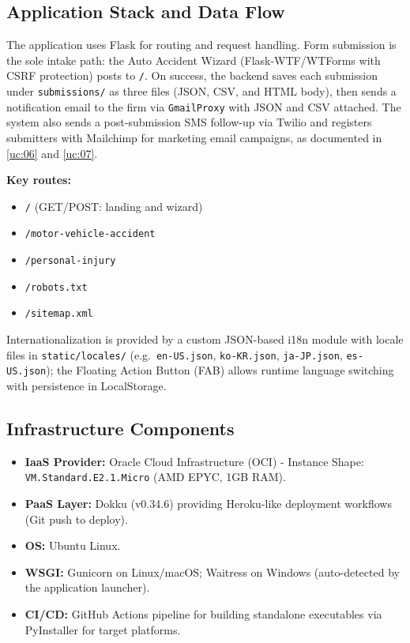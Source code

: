\documentclass{article}
\begin{document}
\subsection{Application Stack and Data Flow}
The application uses Flask for routing and request handling. Form submission is the sole intake path: the Auto Accident Wizard (Flask-WTF/WTForms with CSRF protection) posts to \texttt{/}. On success, the backend saves each submission under \texttt{submissions/} as three files (JSON, CSV, and HTML body), then sends a notification email to the firm via \texttt{GmailProxy} with JSON and CSV attached. The system also sends a post-submission SMS follow-up via Twilio and registers submitters with Mailchimp for marketing email campaigns, as documented in \ref{uc:06} and \ref{uc:07}.

\textbf{Key routes:} 
\begin{itemize}
  \item \texttt{/} (GET/POST: landing and wizard)
  \item \texttt{/motor-vehicle-accident}
  \item \texttt{/personal-injury}
  \item \texttt{/robots.txt}
  \item \texttt{/sitemap.xml}
\end{itemize}
Internationalization is provided by a custom JSON-based i18n 
module with locale files in \texttt{static/locales/} 
(e.g.\ \texttt{en-US.json}, \texttt{ko-KR.json}, \texttt{ja-JP.json}, \texttt{es-US.json}); 
the Floating Action Button (FAB) allows runtime language switching with persistence in LocalStorage.
\subsection{Infrastructure Components}
\begin{itemize}
    \item \textbf{IaaS Provider:} Oracle Cloud Infrastructure (OCI) - Instance Shape: \texttt{VM.Standard.E2.1.Micro} (AMD EPYC, 1GB RAM).
    \item \textbf{PaaS Layer:} Dokku (v0.34.6) providing Heroku-like deployment workflows (Git push to deploy).
    \item \textbf{OS:} Ubuntu Linux.
    \item \textbf{WSGI:} Gunicorn on Linux/macOS; Waitress on Windows (auto-detected by the application launcher).
    \item \textbf{CI/CD:} GitHub Actions pipeline for building standalone executables via PyInstaller for target platforms.
\end{itemize}
\end{document}
